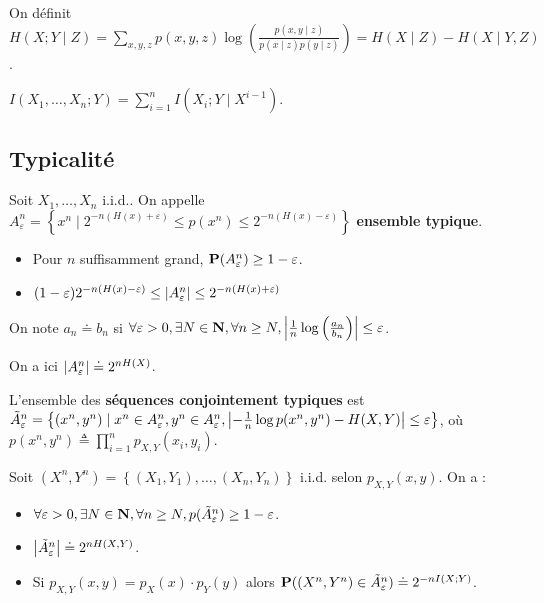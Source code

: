 	\begin{defn}
		On définit $H(X ; Y \mid Z) = \sum_{x,y,z} p(x,y,z) \log \left( \frac{p(x,y \mid z)}{p(x \mid z) p(y \mid z)} \right) = H(X \mid Z) - H(X \mid Y, Z)$.
	\end{defn}

	\begin{thm}
		$I(X_1,\ldots,X_n ; Y) = \sum_{i = 1}^n I(X_i ; Y \mid X^{i - 1})$.
	\end{thm}

\subsection{Typicalité}

	\begin{defn}
		Soit $X_1,\ldots,X_n$ i.i.d..
		On appelle $A_\varepsilon^n = \left\{ x^n \mid 2^{-n(H(x) + \varepsilon)} \leq p(x^n) \leq 2^{-n(H(x) - \varepsilon)} \right\}$ \textbf{ensemble typique}.
	\end{defn}

	\begin{thm}
		\begin{itemize}
			\item[\textbullet] Pour $n$ suffisamment grand, $\mathbf{P}(A_\varepsilon^n) \geq 1 - \varepsilon$.
			\item[\textbullet] $(1 - \varepsilon) 2^{-n(H(x) - \varepsilon)} \leq \left\lvert A_\varepsilon^n\right\rvert \leq 2^{-n(H(x) + \varepsilon)}$
		\end{itemize}
	\end{thm}
	
	\begin{note}
		On note $a_n \doteq b_n$ si $\forall \varepsilon > 0, \exists N \in \mathbf{N}, \forall n \geq N, \left\lvert\frac{1}{n} \log \left( \frac{a_n}{b_n} \right)\right\rvert \leq \varepsilon$.
	\end{note}

	On a ici $\left\lvert A_\varepsilon^n\right\rvert \doteq 2^{n H(X)}$.

	\begin{defn}
		L'ensemble des \textbf{séquences conjointement typiques} est\\
		$\Tilde{A}_\varepsilon^n = \left\{ (x^n,y^n) \mid x^n \in A_\varepsilon^n, y^n \in A_\varepsilon^n, \left\lvert-\frac{1}{n} \log p(x^n,y^n) - H(X,Y)\right\rvert \leq \varepsilon \right\}$, où $p(x^n,y^n) \triangleq \prod_{i = 1}^n p_{X,Y}(x_i,y_i)$.
	\end{defn}
	
	\begin{thm}
		Soit $(X^n,Y^n) = \left\{ (X_1,Y_1), \ldots, (X_n,Y_n) \right\}$ i.i.d. selon $p_{X,Y}(x,y)$.
		On a :
		\begin{itemize}
			\item[\textbullet] $\forall \varepsilon > 0, \exists N \in \mathbf{N}, \forall n \geq N, p(\Tilde{A}_\varepsilon^n) \geq 1 - \varepsilon$.
			\item[\textbullet] $\left\lvert\Tilde{A}_\varepsilon^n\right\rvert \doteq 2^{n H(X,Y)}$.
			\item[\textbullet] Si $p_{X,Y}(x,y) = p_X(x) \cdot p_Y(y)$ alors $\mathbf{P}((X^n,Y^n) \in \Tilde{A}_\varepsilon^n) \doteq 2^{-n I(X;Y)}$.
		\end{itemize}
	\end{thm}


